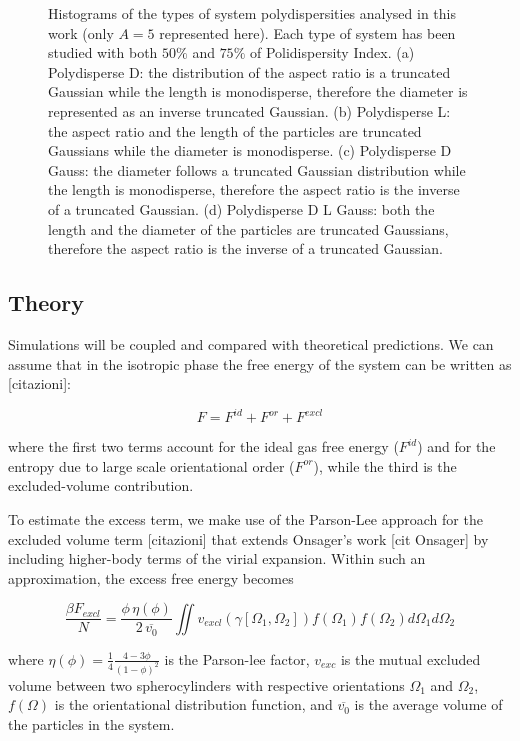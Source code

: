 \documentclass[journal=jacsat,manuscript=article]{achemso}
\begin{document}
\begin{figure}[!h]
    \caption{Histograms of the types of system polydispersities analysed in this work (only $A = 5$ represented here). Each type of system has been studied with both $50 \%$ and $75 \%$ of Polidispersity Index. (a) Polydisperse D: the distribution of the aspect ratio is a truncated Gaussian while the length is monodisperse, therefore the diameter is represented as an inverse truncated Gaussian. (b) Polydisperse L: the aspect ratio and the length of the particles are truncated Gaussians while the diameter is monodisperse. (c) Polydisperse D Gauss: the diameter follows a truncated Gaussian distribution while the length is monodisperse, therefore the aspect ratio is the inverse of a truncated Gaussian. (d) Polydisperse D L Gauss: both the length and the diameter of the particles are truncated Gaussians, therefore the aspect ratio is the inverse of a truncated Gaussian.}
    \label{fig:Polydispersity_histograms}
\end{figure}


\subsection{Theory} \label{sec:Theory}
Simulations will be coupled and compared with theoretical predictions. We can assume that in the isotropic phase the free energy of the system can be written as [citazioni]:

\begin{equation}
	F = F^{id} + F^{or} + F^{excl}
\end{equation}

where the first two terms account for the ideal gas free energy ($F^{id}$) and for the entropy due to large scale orientational order ($F^{or}$), while the third is the excluded-volume contribution. 


To estimate the excess term, we make use of the Parson-Lee approach for the excluded volume term [citazioni] that extends Onsager's work [cit Onsager] by including higher-body terms of the virial expansion. Within such an approximation, the excess free energy becomes 

\begin{equation}
\frac{\beta F_{excl}}{N}  = \frac{\phi \, \eta(\phi)}{2 \, \overline{v_{0}}} \iint v_{excl}(\gamma[\Omega_1, \Omega_2]) f(\Omega_1)f(\Omega_2) d\Omega_1 d\Omega_2    
\end{equation}

where $\eta(\phi) = \frac{1}{4} \frac{4 - 3\phi}{(1 - \phi)^2}$ is the Parson-lee factor, $v_{exc}$ is the mutual excluded volume between two spherocylinders with respective orientations $\Omega_1$ and $\Omega_2$, $f(\Omega)$ is the orientational distribution function, and $\overline{v_0}$ is the average volume of the particles in the system.
\end{document}

